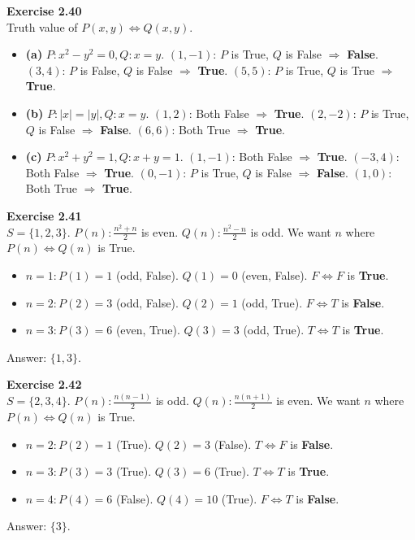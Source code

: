\documentclass[11pt]{article}
\begin{document}
\vspace{10pt}
\textbf{Exercise 2.40} \\
Truth value of $P(x,y) \Leftrightarrow Q(x,y)$.
\begin{itemize}
    \item \textbf{(a)} $P: x^2-y^2=0, Q: x=y$.
    $(1,-1)$: $P$ is True, $Q$ is False $\Rightarrow$ \textbf{False}.
    $(3,4)$: $P$ is False, $Q$ is False $\Rightarrow$ \textbf{True}.
    $(5,5)$: $P$ is True, $Q$ is True $\Rightarrow$ \textbf{True}.
    \item \textbf{(b)} $P: |x|=|y|, Q: x=y$.
    $(1,2)$: Both False $\Rightarrow$ \textbf{True}.
    $(2,-2)$: $P$ is True, $Q$ is False $\Rightarrow$ \textbf{False}.
    $(6,6)$: Both True $\Rightarrow$ \textbf{True}.
    \item \textbf{(c)} $P: x^2+y^2=1, Q: x+y=1$.
    $(1,-1)$: Both False $\Rightarrow$ \textbf{True}.
    $(-3,4)$: Both False $\Rightarrow$ \textbf{True}.
    $(0,-1)$: $P$ is True, $Q$ is False $\Rightarrow$ \textbf{False}.
    $(1,0)$: Both True $\Rightarrow$ \textbf{True}.
\end{itemize}

\vspace{10pt}
\textbf{Exercise 2.41} \\
$S=\{1,2,3\}$. $P(n): \frac{n^2+n}{2}$ is even. $Q(n): \frac{n^2-n}{2}$ is odd. We want $n$ where $P(n) \Leftrightarrow Q(n)$ is True.
\begin{itemize}
    \item $n=1: P(1) = 1$ (odd, False). $Q(1) = 0$ (even, False). $F \Leftrightarrow F$ is \textbf{True}.
    \item $n=2: P(2) = 3$ (odd, False). $Q(2) = 1$ (odd, True). $F \Leftrightarrow T$ is \textbf{False}.
    \item $n=3: P(3) = 6$ (even, True). $Q(3) = 3$ (odd, True). $T \Leftrightarrow T$ is \textbf{True}.
\end{itemize}
Answer: \textbf{$\{1, 3\}$}.

\vspace{10pt}
\textbf{Exercise 2.42} \\
$S=\{2,3,4\}$. $P(n): \frac{n(n-1)}{2}$ is odd. $Q(n): \frac{n(n+1)}{2}$ is even. We want $n$ where $P(n) \Leftrightarrow Q(n)$ is True.
\begin{itemize}
    \item $n=2: P(2) = 1$ (True). $Q(2) = 3$ (False). $T \Leftrightarrow F$ is \textbf{False}.
    \item $n=3: P(3) = 3$ (True). $Q(3) = 6$ (True). $T \Leftrightarrow T$ is \textbf{True}.
    \item $n=4: P(4) = 6$ (False). $Q(4) = 10$ (True). $F \Leftrightarrow T$ is \textbf{False}.
\end{itemize}
Answer: \textbf{$\{3\}$}.
\end{document}
